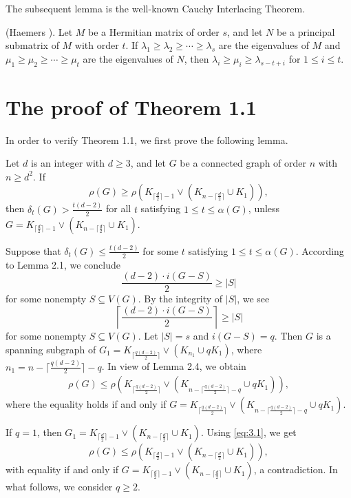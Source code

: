 \documentclass[10pt]{article}
\numberwithin{equation}{section}
\begin{document}
\medskip

The subsequent lemma is the well-known Cauchy Interlacing Theorem.

\medskip

 (Haemers \cite{Hi}). Let $M$ be a Hermitian matrix of order $s$, and let $N$ be a principal submatrix of $M$ with
order $t$. If $\lambda_1\geq\lambda_2\geq\cdots\geq\lambda_s$ are the eigenvalues of $M$ and $\mu_1\geq\mu_2\geq\cdots\geq\mu_t$ are the eigenvalues
of $N$, then $\lambda_i\geq\mu_i\geq\lambda_{s-t+i}$ for $1\leq i\leq t$.


\section{The proof of Theorem 1.1}

In order to verify Theorem 1.1, we first prove the following lemma.

\medskip

 Let $d$ is an integer with $d\geq3$, and let $G$ be a connected graph of order $n$ with $n\geq d^{2}$. If
$$
\rho(G)\geq\rho(K_{\lceil\frac{d}{2}\rceil-1}\vee(K_{n-\lceil\frac{d}{2}\rceil}\cup K_1)),
$$
then $\delta_t(G)>\frac{t(d-2)}{2}$ for all $t$ satisfying $1\leq t\leq\alpha(G)$, unless $G=K_{\lceil\frac{d}{2}\rceil-1}\vee(K_{n-\lceil\frac{d}{2}\rceil}\cup K_1)$.

\medskip

\medskip

 Suppose that $\delta_t(G)\leq\frac{t(d-2)}{2}$ for some $t$ satisfying $1\leq t\leq\alpha(G)$. According to Lemma 2.1,
we conclude
$$
\frac{(d-2)\cdot i(G-S)}{2}\geq|S|
$$
for some nonempty $S\subseteq V(G)$. By the integrity of $|S|$, we see
$$
\left\lceil\frac{(d-2)\cdot i(G-S)}{2}\right\rceil\geq|S|
$$
for some nonempty $S\subseteq V(G)$. Let $|S|=s$ and $i(G-S)=q$. Then $G$ is a spanning subgraph of
$G_1=K_{\lceil\frac{q(d-2)}{2}\rceil}\vee(K_{n_1}\cup qK_1)$, where $n_1=n-\lceil\frac{q(d-2)}{2}\rceil-q$. In view of Lemma 2.4, we obtain
\begin{align}\label{eq:3.1}
\rho(G)\leq\rho(K_{\lceil\frac{q(d-2)}{2}\rceil}\vee(K_{n-\lceil\frac{q(d-2)}{2}\rceil-q}\cup qK_1)),
\end{align}
where the equality holds if and only if $G=K_{\lceil\frac{q(d-2)}{2}\rceil}\vee(K_{n-\lceil\frac{q(d-2)}{2}\rceil-q}\cup qK_1)$.

If $q=1$, then $G_1=K_{\lceil\frac{d}{2}\rceil-1}\vee(K_{n-\lceil\frac{d}{2}\rceil}\cup K_1)$. Using \eqref{eq:3.1}, we get
$$
\rho(G)\leq\rho(K_{\lceil\frac{d}{2}\rceil-1}\vee(K_{n-\lceil\frac{d}{2}\rceil}\cup K_1)),
$$
with equality if and only if $G=K_{\lceil\frac{d}{2}\rceil-1}\vee(K_{n-\lceil\frac{d}{2}\rceil}\cup K_1)$, a contradiction. In what follows,
we consider $q\geq2$.
\end{document}
